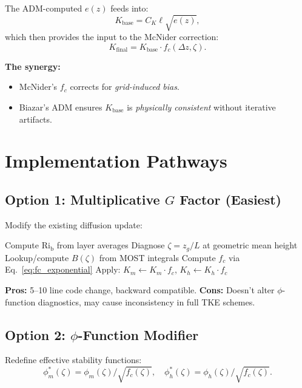 \documentclass[twocolumn,11pt]{article}
\newcommand{\Rib}{\text{Ri}_{\text{b}}}
\begin{document}
The ADM-computed $e(z)$ feeds into:
\begin{equation}
K_{\text{base}} = C_K \ell \sqrt{e(z)},
\end{equation}
which then provides the input to the McNider correction:
\begin{equation}
K_{\text{final}} = K_{\text{base}} \cdot f_c(\Delta z, \zeta).
\end{equation}

\noindent \textbf{The synergy:}
\begin{itemize}
\item McNider's $f_c$ corrects for \textit{grid-induced bias}.
\item Biazar's ADM ensures $K_{\text{base}}$ is \textit{physically consistent} without iterative artifacts.
\end{itemize}

\section{Implementation Pathways}
\label{sec:implementation}

\subsection{Option 1: Multiplicative $G$ Factor (Easiest)}

Modify the existing diffusion update:
\begin{algorithm}
\caption{Multiplicative Correction (WRF/CMAQ compatible)}
\begin{algorithmic}
\STATE Compute $\Rib$ from layer averages
\STATE Diagnose $\zeta = z_g / L$ at geometric mean height
\STATE Lookup/compute $B(\zeta)$ from MOST integrals
\STATE Compute $f_c$ via Eq.~\eqref{eq:fc_exponential}
\STATE Apply: $K_m \leftarrow K_m \cdot f_c$, $K_h \leftarrow K_h \cdot f_c$
\end{algorithmic}
\end{algorithm}

\noindent \textbf{Pros:} 5--10 line code change, backward compatible.  
\noindent \textbf{Cons:} Doesn't alter $\phi$-function diagnostics, may cause inconsistency in full TKE schemes.

\subsection{Option 2: $\phi$-Function Modifier}

Redefine effective stability functions:
\begin{equation}
\phi_m^*(\zeta) = \phi_m(\zeta) / \sqrt{f_c(\zeta)}, \quad \phi_h^*(\zeta) = \phi_h(\zeta) / \sqrt{f_c(\zeta)}.
\end{equation}
\end{document}
